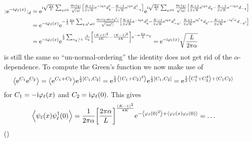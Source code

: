 \documentclass[english, parskip=full]{scrartcl}
\begin{document}
\begin{align}
\normord{\powe{-\i\varphi_\ell(x)}}_d &= \powe{\i \sqrt{\frac{2\pi}{L}} \sum_{q\neq 0} \frac{\Theta(\ell q)}{\sqrt{|q|}} \klb*{\frac{K+1}{2\sqrt{K}} \powe{-\i qx} d_q^\dagger - \frac{K-1}{2\sqrt{K}} \powe{\i qx}d_{-q}^\dagger} } \powe{\i \sqrt{\frac{2\pi}{L}} \sum_{q\neq 0} \frac{\Theta(\ell q)}{\sqrt{|q|}}  \klb*{\frac{K+1}{2\sqrt{K}} \powe{\i qx} d_q - \frac{K-1}{2\sqrt{K}} \powe{-\i qx}d_{-q}}}\\
&= \powe{-\i\varphi_\ell(x)} \powe{-\frac{1}{2} \frac{2\pi}{L} \sum_{q,q'\neq 0} \frac{\Theta(\ell q)\Theta(\ell q')}{\sqrt{|qq'|}} \klb*{\frac{K+1}{2\sqrt{K}} \powe{-\i qx} d_q^\dagger - \frac{K-1}{2\sqrt{K}} \powe{\i qx}d_{-q}^\dagger, \ \frac{K+1}{2\sqrt{K}} \powe{\i q'x} d_{q'} - \frac{K-1}{2\sqrt{K}} \powe{-\i q'x}d_{-q'}} }\\
&= \powe{-\i\varphi_\ell(x)} \powe{\frac{1}{2} \sum_{n_q\ge 1} \frac{1}{n_q} \klb*{\frac{(K+1)^2}{4K} - \frac{(K-1)^2}{4K}} \powe{-\alpha \frac{2\pi}{L} n_q}} = \powe{-\i\varphi_\ell(x)} \sqrt{\frac{L}{2\pi\alpha}}
\end{align}
is still the same so ``un-normal-ordering'' the identity does not get rid of the $\alpha$-dependence.
To compute the Green's function we now make use of
\begin{align}
\bra*{\powe{C_1} \powe{C_2}} &= \bra*{\powe{C_1 + C_2}} \powe{\frac{1}{2} \klb*{C_1, C_2}} = \powe{\frac{1}{2} \bra*{\kla*{C_1 + C_2}^2}} \powe{\frac{1}{2} \klb*{C_1, C_2}} = \powe{\frac{1}{2} \bra*{C_1^2 + C_2^2} + \bra*{C_1C_2}}
\end{align}
for $C_1 = -\text{i}\varphi_\ell(x)$ and $C_2 =\text{i}\varphi_\ell(0)$.
This gives
\begin{align}
\bra*{\psi_\ell(x)\psi_\ell^\dagger(0)} &= \frac{1}{2\pi\alpha} \klb*{\frac{2\pi\alpha}{L}}^\frac{(K-1)^2}{4K} \powe{-\bra*{\varphi_\ell(0)^2} + \bra*{\varphi_\ell(x) \varphi_\ell(0)}} = \dots
\end{align}
()
\end{document}
